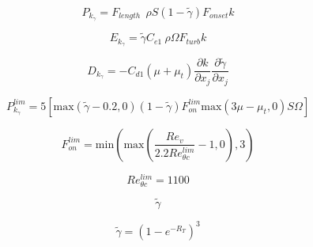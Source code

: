 {\newpage\clearpage
{}%
\begin{displaymath}
  P_{k_\gamma} = F_{length} \phantom{I} \rho S (1-\widetilde{\gamma})F_{onset} k
\end{displaymath}%
\lthtmldisplayZ
\lthtmlcheckvsize\clearpage}

{\newpage\clearpage
{}%
\begin{displaymath}
  E_{k_\gamma} = \widetilde{\gamma} C_{e1}\ \rho\Omega F_{turb} k
\end{displaymath}%
\lthtmldisplayZ
\lthtmlcheckvsize\clearpage}

{\newpage\clearpage
{}%
\begin{displaymath}
  D_{k_\gamma} = -C_{d1}(\mu + \mu_t)\frac{\partial k}{\partial x_j}\frac{\partial \widetilde{\gamma}}{\partial x_j}
\end{displaymath}%
\lthtmldisplayZ
\lthtmlcheckvsize\clearpage}

{\newpage\clearpage
{}%
\begin{displaymath}
  P_{k_\gamma}^{lim} = 5\left[\text{max}(\widetilde{\gamma} - 0.2, 0)(1-\widetilde{\gamma})F_{on}^{lim}\text{max}(3\mu - \mu_t,0)S\Omega\right]
\end{displaymath}%
\lthtmldisplayZ
\lthtmlcheckvsize\clearpage}

{\newpage\clearpage
{}%
\begin{displaymath}
  F_{on}^{lim} = \text{min}\left(\text{max}\left(\frac{Re_v}{2.2Re_{\theta c}^{lim}}-1, 0\right),3\right)
\end{displaymath}%
\lthtmldisplayZ
\lthtmlcheckvsize\clearpage}

{\newpage\clearpage
{}%
\begin{displaymath}
  Re_{\theta c}^{lim} = 1100
\end{displaymath}%
\lthtmldisplayZ
\lthtmlcheckvsize\clearpage}

{\newpage\clearpage
{}%
\begin{displaymath}
\widetilde{\gamma}
\end{displaymath}%
\lthtmldisplayZ
\lthtmlcheckvsize\clearpage}

{\newpage\clearpage
{}%
\begin{displaymath}
\widetilde{\gamma} = \left(1-e^{-R_T}\right)^3
\end{displaymath}%
\lthtmldisplayZ
\lthtmlcheckvsize\clearpage}

